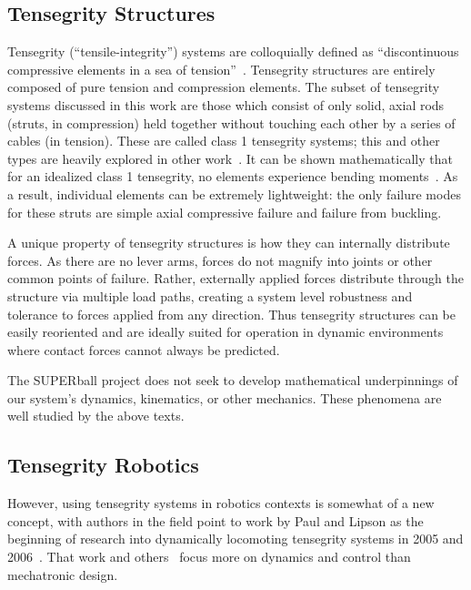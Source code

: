 \documentclass[12pt]{report}
\begin{document}
\subsection{Tensegrity Structures}

Tensegrity (``tensile-integrity'') systems are colloquially defined as ``discontinuous compressive elements in a sea of tension''~\cite{fuller1962tensile}.
Tensegrity structures are entirely composed of pure tension and compression elements.
The subset of tensegrity systems discussed in this work are those which consist of only solid, axial rods (struts, in compression) held together without touching each other by a series of cables (in tension).
These are called class 1 tensegrity systems; this and other types are heavily explored in other work~\cite{C.R.1978,Skelton2009,sultan2002,Motro2003,Zhang2006a,BelHadjAli2010a}.
It can be shown mathematically that for an idealized class 1 tensegrity, no elements experience bending moments~\cite{skelton2001introduction}.
As a result, individual elements can be extremely lightweight: the only failure modes for these struts are simple axial compressive failure and failure from buckling.

A unique property of tensegrity structures is how they can internally distribute forces.  
As there are no lever arms, forces do not magnify into joints or other common points of failure.  
Rather, externally applied forces distribute through the structure via multiple load paths, creating a system level robustness and tolerance to forces applied from any direction.  
Thus tensegrity structures can be easily reoriented and are ideally suited for operation in dynamic environments where contact forces cannot always be predicted.

The SUPERball project does not seek to develop mathematical underpinnings of our system's dynamics, kinematics, or other mechanics.
These phenomena are well studied by the above texts.

\subsection{Tensegrity Robotics}

However, using tensegrity systems in robotics contexts is somewhat of a new concept, with authors in the field point to work by Paul and Lipson as the beginning of research into dynamically locomoting tensegrity systems in 2005 and 2006~\cite{Paul2005,Paul2006a}.
That work and others~\cite{miratstur2011athree-dof} focus more on dynamics and control than mechatronic design.
\end{document}
